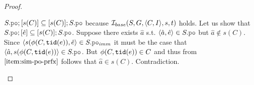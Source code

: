 \documentclass[12pt]{article}
\begin{document}
\begin{proof}
\begin{itemize}
    $S.\lPO;[s(C)] \subseteq [s(C)];S.\lPO$ because $\mathcal{I}_{base}(S, G, \langle C, I \rangle, s, t)$ holds.
    Let us show that $S.\lPO;[\hat{e}] \subseteq [s(C)];S.\lPO$.
    Suppose there exists $\hat{a}$ s.t. $\tup{\hat{a}, \hat{e}} \in S.\lPO$ but
    $\hat{a} \not\in s(C)$.
    Since $\tup{s(\front(C, \lTID(e)), \hat{e}} \in S.\lPO_{imm}$
    it must be the case that $\tup{\hat{a}, s(\front(C, \lTID(e))} \in S.\lPO$.
    But $\phi(C, {\mathtt{tid}}(e)) \in C$ and thus from $\ref{item:sim-po-prfx}$
    follows that $\hat{a} \in s(C)$. Contradiction.
    
    
    
    
    

    

\end{itemize}
\end{proof}
\end{document}

